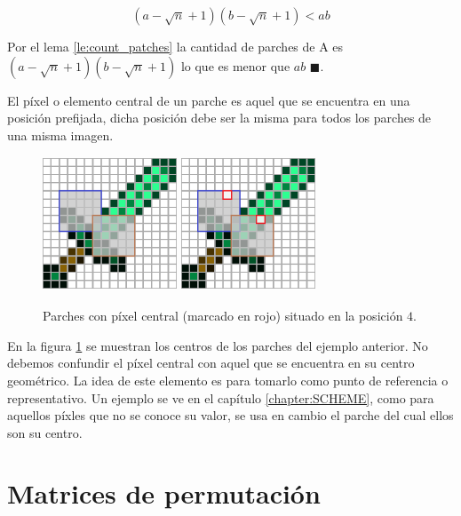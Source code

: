 \begin{equation}
	(a - \sqrt{n} + 1)(b - \sqrt{n} + 1) < ab
	\label{eq:count_patches_ieq}
\end{equation}

Por el lema \ref{le:count_patches} la cantidad de parches de A es $(a - \sqrt{n} + 1)(b - \sqrt{n} + 1)$ lo que es menor que $ab$ $\blacksquare$.

\begin{definition}
	El p\'ixel o elemento central de un parche es aquel que se encuentra en una posici\'on prefijada, dicha posici\'on debe ser la misma para todos los parches de una misma imagen.
\end{definition}

\begin{figure}[h]
	\centering
	\includegraphics[width=4cm, height=4cm]{Graphics/diamon_sword_with_patches.png}
	\hspace{1cm}
	\includegraphics[width=4cm, height=4cm]{Graphics/diamon_sword_with_patches_and_centers.png}
	\caption{Parches con p\'ixel central (marcado en rojo) situado en la posici\'on $4$.}
	\label{ex:patch_center}
\end{figure}

En la figura \ref{ex:patch_center} se muestran los centros de los parches del ejemplo anterior. No debemos confundir el p\'ixel central con aquel que se encuentra en su centro geom\'etrico. La idea de este elemento es para tomarlo como punto de referencia o representativo. Un ejemplo se ve en el cap\'itulo \ref{chapter:SCHEME}, como para aquellos p\'ixles que no se conoce su valor, se usa en cambio el parche del cual ellos son su centro.

\section{Matrices de permutaci\'on}\label{sec:permutation_matrices}

